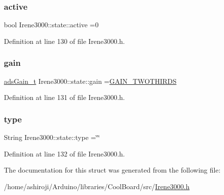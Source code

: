 \subsubsection{\texorpdfstring{active}{active}}
{\footnotesize\ttfamily bool Irene3000\+::state\+::active =0}



Definition at line 130 of file Irene3000.\+h.

\mbox{\label{struct_irene3000_1_1state_a1ecf69d38cb31ecaf6b3602a3f3e93cb}} 
\subsubsection{\texorpdfstring{gain}{gain}}
{\footnotesize\ttfamily \hyperlink{_cool_adafruit___a_d_s1015_8h_a3d6c0e15829a207b9155890811fa4781}{ads\+Gain\+\_\+t} Irene3000\+::state\+::gain =\hyperlink{_cool_adafruit___a_d_s1015_8h_a3d6c0e15829a207b9155890811fa4781a879d688347ec0bf159fe1278db602f68}{G\+A\+I\+N\+\_\+\+T\+W\+O\+T\+H\+I\+R\+DS}}



Definition at line 131 of file Irene3000.\+h.

\mbox{\label{struct_irene3000_1_1state_a9897a7e02727db6351d44006eec73799}} 
\subsubsection{\texorpdfstring{type}{type}}
{\footnotesize\ttfamily String Irene3000\+::state\+::type =\char`\"{}\char`\"{}}



Definition at line 132 of file Irene3000.\+h.



The documentation for this struct was generated from the following file\+:\begin{DoxyCompactItemize}
\item 
/home/ashiroji/\+Arduino/libraries/\+Cool\+Board/src/\hyperlink{_irene3000_8h}{Irene3000.\+h}\end{DoxyCompactItemize}
